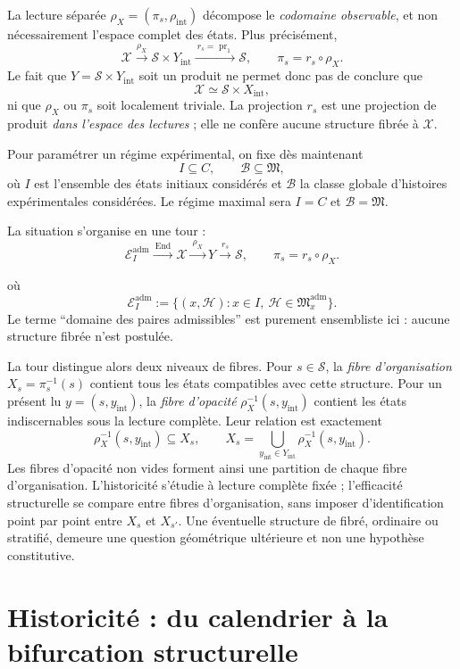\documentclass[11pt,a4paper]{article}
\theoremstyle{definition}
\theoremstyle{remark}
\newcommand{\X}{\mathcal X}
\newcommand{\Sstruct}{\mathcal S}
\newcommand{\M}{\mathfrak M}
\newcommand{\Madm}{\mathfrak M^{\mathrm{adm}}}
\newcommand{\End}{\operatorname{End}}
\begin{document}
La lecture séparée $\rho_X=(\pi_s,\rho_{\mathrm{int}})$ décompose le \emph{codomaine observable}, et non nécessairement l'espace complet des états. Plus précisément,
\[
\X\xrightarrow{\rho_X}\Sstruct\times Y_{\mathrm{int}}
\xrightarrow{\ r_s=\operatorname{pr}_1\ }\Sstruct,
\qquad \pi_s=r_s\circ\rho_X.
\]
Le fait que $Y=\Sstruct\times Y_{\mathrm{int}}$ soit un produit ne permet donc pas de conclure que
\[
\X\simeq\Sstruct\times X_{\mathrm{int}},
\]
ni que $\rho_X$ ou $\pi_s$ soit localement triviale. La projection $r_s$ est une projection de produit \emph{dans l'espace des lectures} ; elle ne confère aucune structure fibrée à $\X$.

Pour paramétrer un régime expérimental, on fixe dès maintenant
\[
\boxed{I\subseteq C,\qquad \mathcal B\subseteq\M,}
\]
où $I$ est l'ensemble des états initiaux considérés et $\mathcal B$ la classe globale d'histoires expérimentales considérées. Le régime maximal sera $I=C$ et $\mathcal B=\M$.

La situation s'organise en une tour :
\[
\boxed{
\mathcal E_I^{\mathrm{adm}}\xrightarrow{\ \End\ }\X
\xrightarrow{\ \rho_X\ }Y
\xrightarrow{\ r_s\ }\Sstruct,
\qquad \pi_s=r_s\circ\rho_X .}
\]

où
\[
\mathcal E_I^{\mathrm{adm}}:=\{(x,\mathcal H):x\in I,\ \mathcal H\in\Madm_x\}.
\]
Le terme ``domaine des paires admissibles'' est purement ensembliste ici : aucune structure fibrée n'est postulée.

La tour distingue alors deux niveaux de fibres. Pour $s\in\Sstruct$, la \emph{fibre d'organisation}
$X_s=\pi_s^{-1}(s)$ contient tous les états compatibles avec cette structure. Pour un présent lu $y=(s,y_{\mathrm{int}})$, la \emph{fibre d'opacité} $\rho_X^{-1}(s,y_{\mathrm{int}})$ contient les états indiscernables sous la lecture complète. Leur relation est exactement
\[
\boxed{
\rho_X^{-1}(s,y_{\mathrm{int}})\subseteq X_s,
\qquad
X_s=\bigcup_{y_{\mathrm{int}}\in Y_{\mathrm{int}}}
\rho_X^{-1}(s,y_{\mathrm{int}}).
}
\]
Les fibres d'opacité non vides forment ainsi une partition de chaque fibre d'organisation. L'historicité s'étudie à lecture complète fixée ; l'efficacité structurelle se compare entre fibres d'organisation, sans imposer d'identification point par point entre $X_s$ et $X_{s'}$. Une éventuelle structure de fibré, ordinaire ou stratifié, demeure une question géométrique ultérieure et non une hypothèse constitutive.

\section{Historicité : du calendrier à la bifurcation structurelle}
\end{document}
